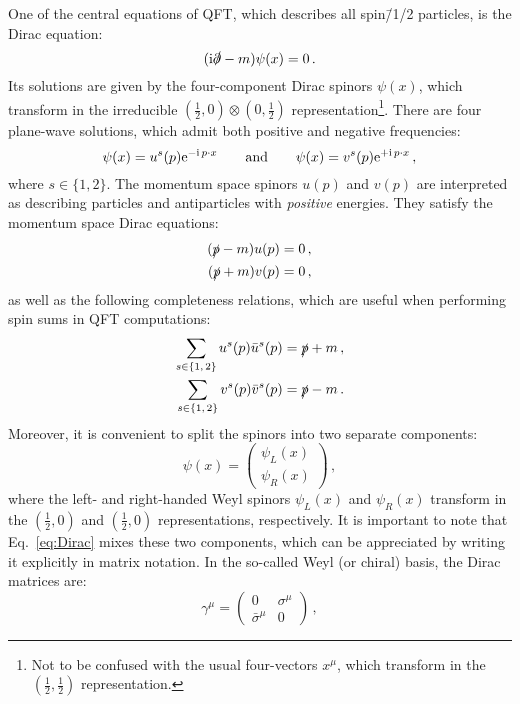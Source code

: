 \documentclass[main.tex]{subfiles}
\begin{document}
One of the central equations of QFT, which describes all spin\=/1/2 particles, is the Dirac equation:
\begin{equation} \label{eq:Dirac}
    (\mathrm{i} \slashed{\partial}-m)\psi(x) = 0\,.
\end{equation}
Its solutions are given by the four-component Dirac spinors $\psi(x)$, which transform in the irreducible $\left(\frac{1}{2}, 0\right) \otimes \left(0, \frac{1}{2}\right)$ representation\footnote{Not to be confused with the usual four-vectors $x^\mu$, which transform in the $\left(\frac{1}{2}, \frac{1}{2}\right)$ representation.}. There are four plane-wave solutions, which admit both positive and negative frequencies:
\begin{equation}
    \psi(x) = u^s(p)\mathrm{e}^{-\mathrm{i}\, p\cdot x} \qquad \text{and} \qquad \psi(x) = v^s(p)\mathrm{e}^{+\mathrm{i}\, p\cdot x}\,,
\end{equation}
where $s \in \{1, 2\}$. The momentum space spinors $u(p)$ and $v(p)$ are interpreted as describing particles and antiparticles with \textit{positive} energies. They satisfy the momentum space Dirac equations: 
\begin{align}
    (\slashed{p} - m)u(p) &= 0\,, \nonumber \\
    (\slashed{p} + m)v(p) &= 0\,,
\end{align}
as well as the following completeness relations, which are useful when performing spin sums in QFT computations:
\begin{align} \label{eq:completeness:fermions}
    \sum_{s \in \{1,\, 2\}} u^s(p)\bar{u}^s(p) &= \slashed{p} + m\, \nonumber, \\
    \sum_{s \in \{1,\, 2\}} v^s(p)\bar{v}^s(p) &= \slashed{p} - m\,.
\end{align}
Moreover, it is convenient to split the spinors into two separate components:
\begin{equation}
    \psi(x) = 
    \begin{pmatrix}
        \psi_L(x) \\
        \psi_R(x)
    \end{pmatrix}\,,
\end{equation}
where the left- and right-handed Weyl spinors $\psi_L(x)$ and $\psi_R(x)$ transform in the $\left(\frac{1}{2}, 0 \right)$ and $\left(\frac{1}{2}, 0 \right)$ representations, respectively. It is important to note that Eq.~\ref{eq:Dirac} mixes these two components, which can be appreciated by writing it explicitly in matrix notation. In the so-called Weyl (or chiral) basis, the Dirac matrices are:
\begin{equation}
    \gamma^\mu = 
    \begin{pmatrix}
        0 & \sigma^\mu \\
        \bar{\sigma}^\mu & 0
    \end{pmatrix}\,,
\end{equation}
\end{document}

